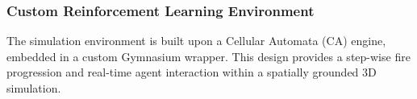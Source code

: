 \documentclass[conference]{IEEEtran}
\begin{document}
\subsubsection{Custom Reinforcement Learning Environment}

The simulation environment is built upon a Cellular Automata (CA) engine, embedded in a custom Gymnasium wrapper. This design provides a step-wise fire progression and real-time agent interaction within a spatially grounded 3D simulation.









\end{document}
